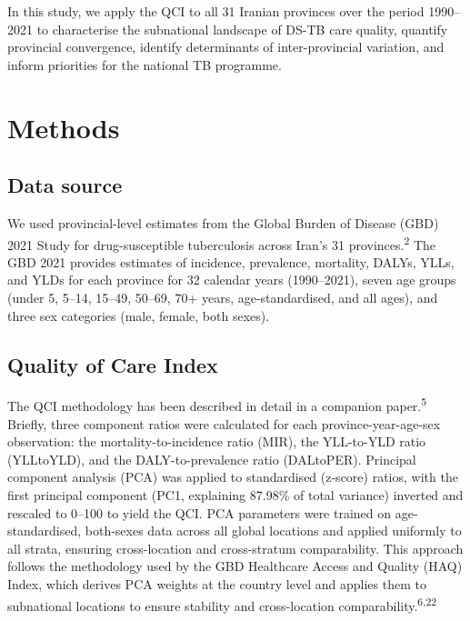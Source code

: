 \documentclass[12pt]{article}
\begin{document}
In this study, we apply the QCI to all 31 Iranian provinces over the period 1990--2021 to characterise the subnational landscape of DS-TB care quality, quantify provincial convergence, identify determinants of inter-provincial variation, and inform priorities for the national TB programme.


\section{Methods}

\subsection{Data source}

We used provincial-level estimates from the Global Burden of Disease (GBD) 2021 Study for drug-susceptible tuberculosis across Iran's 31 provinces.\textsuperscript{2} The GBD 2021 provides estimates of incidence, prevalence, mortality, DALYs, YLLs, and YLDs for each province for 32 calendar years (1990--2021), seven age groups (under 5, 5--14, 15--49, 50--69, 70+ years, age-standardised, and all ages), and three sex categories (male, female, both sexes).

\subsection{Quality of Care Index}

The QCI methodology has been described in detail in a companion paper.\textsuperscript{5} Briefly, three component ratios were calculated for each province-year-age-sex observation: the mortality-to-incidence ratio (MIR), the YLL-to-YLD ratio (YLLtoYLD), and the DALY-to-prevalence ratio (DALtoPER). Principal component analysis (PCA) was applied to standardised (z-score) ratios, with the first principal component (PC1, explaining 87.98\% of total variance) inverted and rescaled to 0--100 to yield the QCI. PCA parameters were trained on age-standardised, both-sexes data across all global locations and applied uniformly to all strata, ensuring cross-location and cross-stratum comparability. This approach follows the methodology used by the GBD Healthcare Access and Quality (HAQ) Index, which derives PCA weights at the country level and applies them to subnational locations to ensure stability and cross-location comparability.\textsuperscript{6,22}
\end{document}
